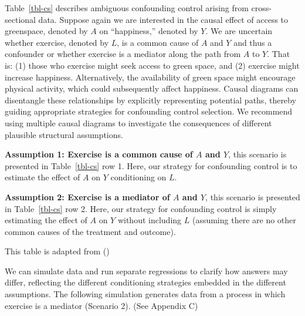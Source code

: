 \documentclass[
  single column]{article}
\begin{document}
Table~\ref{tbl-cs} describes ambiguous confounding control arising from
cross-sectional data. Suppose again we are interested in the causal
effect of access to greenspace, denoted by \(A\) on ``happiness,''
denoted by \(Y\). We are uncertain whether exercise, denoted by \(L\),
is a common cause of \(A\) and \(Y\) and thus a confounder or whether
exercise is a mediator along the path from \(A\) to \(Y\). That is: (1)
those who exercise might seek access to green space, and (2) exercise
might increase happiness. Alternatively, the availability of green space
might encourage physical activity, which could subsequently affect
happiness. Causal diagrams can disentangle these relationships by
explicitly representing potential paths, thereby guiding appropriate
strategies for confounding control selection. We recommend using
multiple causal diagrams to investigate the consequences of different
plausible structural assumptions.

\textbf{Assumption 1: Exercise is a common cause of \(A\) and \(Y\)},
this scenario is presented in Table~\ref{tbl-cs} row 1. Here, our
strategy for confounding control is to estimate the effect of \(A\) on
\(Y\) conditioning on \(L\).

\textbf{Assumption 2: Exercise is a mediator of \(A\) and \(Y\)}, this
scenario is presented in Table~\ref{tbl-cs} row 2. Here, our strategy
for confounding control is simply estimating the effect of \(A\) on
\(Y\) without including \(L\) (assuming there are no other common causes
of the treatment and outcome).

\begin{table}

\caption{\label{tbl-cs}This table is adapted from
()}

\centering{

\examplecrosssection

}

\end{table}%

We can simulate data and run separate regressions to clarify how answers
may differ, reflecting the different conditioning strategies embedded in
the different assumptions. The following simulation generates data from
a process in which exercise is a mediator (Scenario 2). (See Appendix C)
\end{document}
